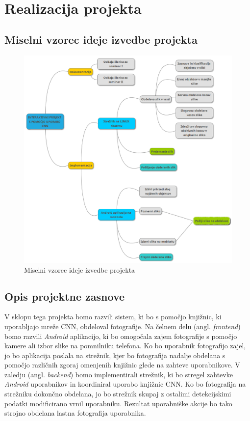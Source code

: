 \documentclass[runningheads,a4paper]{llncs}
\begin{document}
\section{Realizacija projekta}

\subsection{Miselni vzorec ideje izvedbe projekta}

\begin{figure}[H]
\centering
\includegraphics[width=150mm, center]{figures/mind_map.png}
\caption{Miselni vzorec ideje izvedbe projekta}
\label{fig:mind_map}
\end{figure}

\subsection{Opis projektne zasnove}
V sklopu tega projekta bomo razvili sistem, ki bo s pomočjo knjižnic, ki uporabljajo mreže CNN, obdeloval fotografije. 
Na čelnem delu (angl. \textit{frontend}) bomo razvili \textit{Android} aplikacijo, ki bo omogočala zajem fotografije s pomočjo kamere ali izbor slike na pomnilniku telefona. Ko bo uporabnik fotografijo zajel, jo bo aplikacija poslala na strežnik, kjer bo fotografija nadalje obdelana s pomočjo različnih zgoraj omenjenih knjižnic glede na zahteve uporabnikove. V zaledju (angl. \textit{backend}) bomo implementirali strežnik, ki bo stregel zahtevke \textit{Android} uporabnikov in koordiniral uporabo knjižnic CNN. Ko bo fotografija na strežniku dokončno obdelana, jo bo strežnik skupaj z ostalimi detekcijskimi podatki modificirano vrnil uporabniku. Rezultat uporabniške akcije bo tako strojno obdelana lastna fotografija uporabnika.
\end{document}
